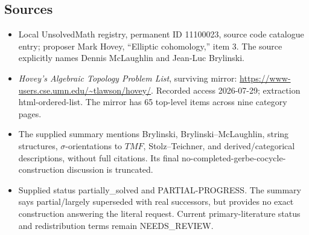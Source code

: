 \documentclass[11pt]{article}
\begin{document}
\subsection{Sources}
\begin{itemize}
\item Local UnsolvedMath registry, permanent ID 11100023, source code catalogue entry; proposer Mark Hovey, ``Elliptic cohomology,'' item 3. The source explicitly names Dennis McLaughlin and Jean-Luc Brylinski.
\item \emph{Hovey's Algebraic Topology Problem List}, surviving mirror: \url{https://www-users.cse.umn.edu/~tlawson/hovey/}. Recorded access 2026-07-29; extraction html-ordered-list. The mirror has 65 top-level items across nine category pages.
\item The supplied summary mentions Brylinski, Brylinski--McLaughlin, string structures, \(\sigma\)-orientations to \(TMF\), Stolz--Teichner, and derived/categorical descriptions, without full citations. Its final no-completed-gerbe-cocycle-construction discussion is truncated.
\item Supplied status partially\_solved and PARTIAL-PROGRESS. The summary says partial/largely superseded with real successors, but provides no exact construction answering the literal request. Current primary-literature status and redistribution terms remain NEEDS\_REVIEW.
\end{itemize}
\end{document}
